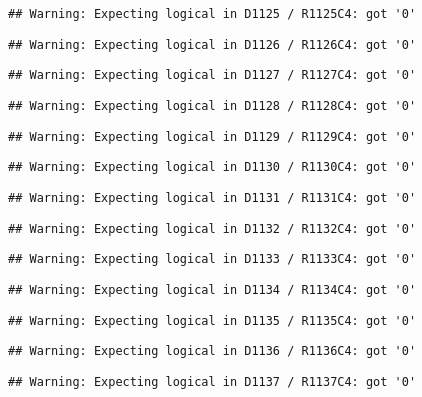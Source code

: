\documentclass[
]{article}
\begin{document}
\begin{verbatim}
## Warning: Expecting logical in D1125 / R1125C4: got '0'
\end{verbatim}

\begin{verbatim}
## Warning: Expecting logical in D1126 / R1126C4: got '0'
\end{verbatim}

\begin{verbatim}
## Warning: Expecting logical in D1127 / R1127C4: got '0'
\end{verbatim}

\begin{verbatim}
## Warning: Expecting logical in D1128 / R1128C4: got '0'
\end{verbatim}

\begin{verbatim}
## Warning: Expecting logical in D1129 / R1129C4: got '0'
\end{verbatim}

\begin{verbatim}
## Warning: Expecting logical in D1130 / R1130C4: got '0'
\end{verbatim}

\begin{verbatim}
## Warning: Expecting logical in D1131 / R1131C4: got '0'
\end{verbatim}

\begin{verbatim}
## Warning: Expecting logical in D1132 / R1132C4: got '0'
\end{verbatim}

\begin{verbatim}
## Warning: Expecting logical in D1133 / R1133C4: got '0'
\end{verbatim}

\begin{verbatim}
## Warning: Expecting logical in D1134 / R1134C4: got '0'
\end{verbatim}

\begin{verbatim}
## Warning: Expecting logical in D1135 / R1135C4: got '0'
\end{verbatim}

\begin{verbatim}
## Warning: Expecting logical in D1136 / R1136C4: got '0'
\end{verbatim}

\begin{verbatim}
## Warning: Expecting logical in D1137 / R1137C4: got '0'
\end{verbatim}
\end{document}
